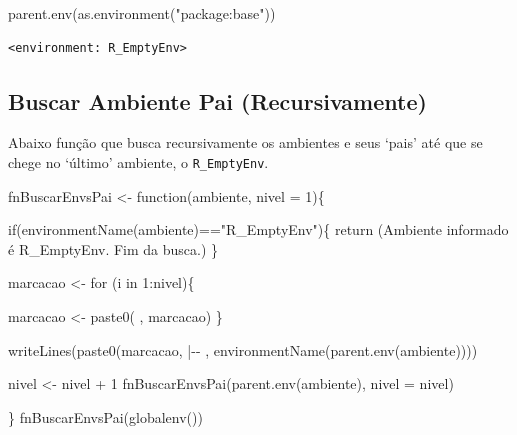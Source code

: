 \documentclass[
  letterpaper,
  DIV=11,
  numbers=noendperiod]{scrreprt}
\newenvironment{Shaded}{\begin{snugshade}}{\end{snugshade}}
\newcommand{\AttributeTok}[1]{\textcolor[rgb]{0.40,0.45,0.13}{#1}}
\newcommand{\ControlFlowTok}[1]{\textcolor[rgb]{0.00,0.23,0.31}{#1}}
\newcommand{\DecValTok}[1]{\textcolor[rgb]{0.68,0.00,0.00}{#1}}
\newcommand{\FunctionTok}[1]{\textcolor[rgb]{0.28,0.35,0.67}{#1}}
\newcommand{\NormalTok}[1]{\textcolor[rgb]{0.00,0.23,0.31}{#1}}
\newcommand{\OtherTok}[1]{\textcolor[rgb]{0.00,0.23,0.31}{#1}}
\newcommand{\SpecialCharTok}[1]{\textcolor[rgb]{0.37,0.37,0.37}{#1}}
\newcommand{\StringTok}[1]{\textcolor[rgb]{0.13,0.47,0.30}{#1}}
\begin{document}
\begin{Shaded}
\begin{Highlighting}[]
\FunctionTok{parent.env}\NormalTok{(}\FunctionTok{as.environment}\NormalTok{(}\StringTok{"package:base"}\NormalTok{))}
\end{Highlighting}
\end{Shaded}

\begin{verbatim}
<environment: R_EmptyEnv>
\end{verbatim}

\hypertarget{buscar-ambiente-pai-recursivamente}{%
\subsection{Buscar Ambiente Pai
(Recursivamente)}\label{buscar-ambiente-pai-recursivamente}}

Abaixo função que busca recursivamente os ambientes e seus `pais' até
que se chege no `último' ambiente, o \texttt{R\_EmptyEnv}.

\begin{Shaded}
\begin{Highlighting}[]
\NormalTok{fnBuscarEnvsPai }\OtherTok{\textless{}{-}} \ControlFlowTok{function}\NormalTok{(ambiente, }\AttributeTok{nivel =} \DecValTok{1}\NormalTok{)\{}
 
    \ControlFlowTok{if}\NormalTok{(}\FunctionTok{environmentName}\NormalTok{(ambiente)}\SpecialCharTok{==}\StringTok{"R\_EmptyEnv"}\NormalTok{)\{}
    \FunctionTok{return}\NormalTok{ (}\StringTok{\textquotesingle{}Ambiente informado é R\_EmptyEnv. Fim da busca.\textquotesingle{}}\NormalTok{)}
\NormalTok{    \}}
    
\NormalTok{    marcacao }\OtherTok{\textless{}{-}} \StringTok{\textquotesingle{}\textquotesingle{}}
    \ControlFlowTok{for}\NormalTok{ (i }\ControlFlowTok{in} \DecValTok{1}\SpecialCharTok{:}\NormalTok{nivel)\{}
      
\NormalTok{      marcacao }\OtherTok{\textless{}{-}} \FunctionTok{paste0}\NormalTok{(}\StringTok{\textquotesingle{} \textquotesingle{}}\NormalTok{, marcacao)}
\NormalTok{    \}}
    
    \FunctionTok{writeLines}\NormalTok{(}\FunctionTok{paste0}\NormalTok{(marcacao, }\StringTok{\textquotesingle{}|{-}{-} \textquotesingle{}}\NormalTok{, }\FunctionTok{environmentName}\NormalTok{(}\FunctionTok{parent.env}\NormalTok{(ambiente))))}

\NormalTok{    nivel }\OtherTok{\textless{}{-}}\NormalTok{ nivel }\SpecialCharTok{+} \DecValTok{1}
    \FunctionTok{fnBuscarEnvsPai}\NormalTok{(}\FunctionTok{parent.env}\NormalTok{(ambiente), }\AttributeTok{nivel =}\NormalTok{ nivel)}

\NormalTok{\}}
\FunctionTok{fnBuscarEnvsPai}\NormalTok{(}\FunctionTok{globalenv}\NormalTok{())}
\end{Highlighting}
\end{Shaded}
\end{document}
